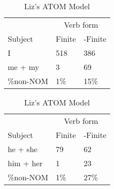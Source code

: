 \begin{table}[]
    \caption{Liz's ATOM Model}
    \begin{minipage}{0.5\textwidth}
    \centering
    \begin{tabular}{@{}lll@{}}
        \toprule
         &\multicolumn{2}{c}{Verb form}\\
         \cline{2-3}
        Subject & Finite & -Finite \\
        \midrule
        I & 518 & 386 \\
        me + my & 3 & 69 \\
        \hline
        \%non-NOM & 1\% & 15\% \\
        \bottomrule
    \end{tabular}
\end{minipage}
\begin{minipage}{0.5\textwidth}
    \centering
    \begin{tabular}{@{}lll@{}}
        \toprule
         &\multicolumn{2}{c}{Verb form}\\
         \cline{2-3}
        Subject & Finite & -Finite \\
        \midrule
        he + she & 79 & 62 \\
        him + her & 1 & 23 \\
        \hline
        \%non-NOM & 1\% & 27\% \\
        \bottomrule
    \end{tabular}
    \end{minipage}
    \begin{minipage}{0.5\textwidth}
    

\end{minipage}
\end{table}
